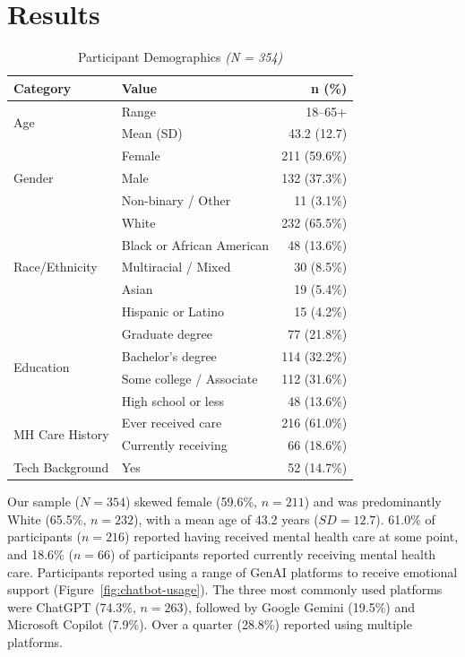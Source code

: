 \documentclass[letterpaper,twocolumn,10pt]{article}
\begin{document}
\section{Results} \label{sec:results}
\begin{table}[htbp]
\centering
\small
\begin{tabular}{llr}
\toprule[1pt]
\textbf{Category} & \textbf{Value} & \textbf{n (\%)} \\
\midrule
\multirow{2}{*}{Age} & Range & 18--65+ \\
 & Mean (SD) & 43.2 (12.7) \\
\hline
\multirow{3}{*}{Gender} & Female & 211 (59.6\%) \\
 & Male & 132 (37.3\%) \\
 & Non-binary / Other & 11 (3.1\%) \\
\hline
\multirow{5}{*}{Race/Ethnicity} & White & 232 (65.5\%) \\
 & Black or African American & 48 (13.6\%) \\
 & Multiracial / Mixed & 30 (8.5\%) \\
 & Asian & 19 (5.4\%) \\
 & Hispanic or Latino & 15 (4.2\%) \\
\hline
\multirow{4}{*}{Education} & Graduate degree & 77 (21.8\%) \\
 & Bachelor's degree & 114 (32.2\%) \\
 & Some college / Associate & 112 (31.6\%) \\
 & High school or less & 48 (13.6\%) \\
\hline
\multirow{2}{*}{MH Care History} & Ever received care & 216 (61.0\%) \\
 & Currently receiving & 66 (18.6\%) \\
\hline
Tech Background & Yes & 52 (14.7\%) \\
\bottomrule[1pt]
\end{tabular}
\caption{Participant Demographics \textit{(N = 354)}} \label{tab:demographics}
\end{table} 

Our sample ($N=354$) skewed female (59.6\%, $n=211$) and was predominantly White (65.5\%, $n=232$), with a mean age of 43.2 years ($SD=12.7$). 61.0\% of participants ($n=216$) reported having received mental health care at some point, and 18.6\% ($n=66$) of participants reported currently receiving mental health care. Participants reported using a range of GenAI platforms to receive emotional support (Figure~\ref{fig:chatbot-usage}). The three most commonly used platforms were ChatGPT (74.3\%, $n=263$), followed by Google Gemini (19.5\%) and Microsoft Copilot (7.9\%). Over a quarter (28.8\%) reported using multiple platforms.
\end{document}
